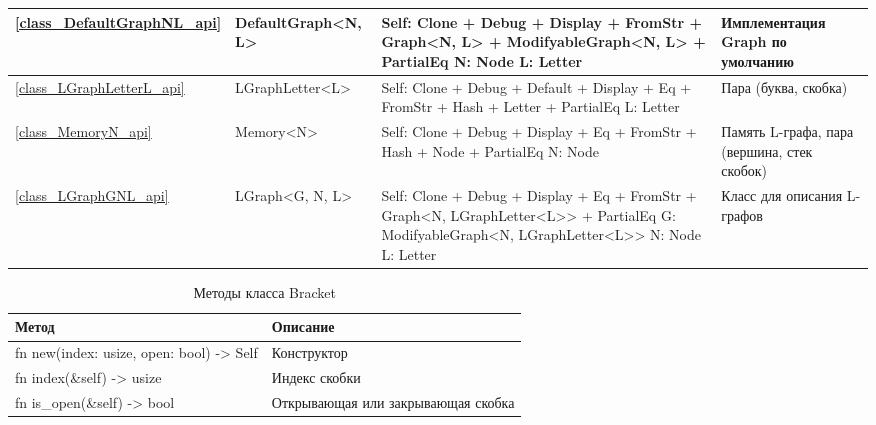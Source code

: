 \begin{longtable}[c]{|m{4em}|m{9em}|m{10em}|m{10em}|}
    \hline
        \ref{class_DefaultGraphNL_api} & DefaultGraph<N, L> & Self: Clone + Debug + Display + FromStr + Graph<N, L> + ModifyableGraph<N, L> + PartialEq \newline N: Node \newline L: Letter & Имплементация Graph по умолчанию \\
    \hline
        \ref{class_LGraphLetterL_api} & LGraphLetter<L> & Self: Clone + Debug + Default + Display + Eq + FromStr + Hash + Letter + PartialEq \newline L: Letter & Пара (буква, скобка) \\
    \hline
        \ref{class_MemoryN_api} & Memory<N> & Self: Clone + Debug + Display + Eq + FromStr + Hash + Node + PartialEq \newline N: Node & Память L-графа, пара (вершина, стек скобок) \\
    \hline
        \ref{class_LGraphGNL_api} & LGraph<G, N, L> & Self: Clone + Debug + Display + Eq + FromStr + Graph<N, LGraphLetter<L>{}> + PartialEq \newline G: ModifyableGraph<N, LGraphLetter<L>{}> \newline N: Node \newline L: Letter & Класс для описания L-графов\\
    \hline
\end{longtable}

\begin{table}
    \caption{Методы класса Bracket}
    \label{class_Bracket_api}
    \begin{tabular}{|m{20em}|m{20em}|}
        \hline
        \textbf{Метод} & \textbf{Описание}\\
        \hline
            fn new(index: usize, open: bool) -> Self & Конструктор \\
        \hline
            fn index(\&self) -> usize & Индекс скобки \\
        \hline
            fn is\_open(\&self) -> bool & Открывающая или закрывающая скобка \\
        \hline
    \end{tabular}
\end{table}
    


